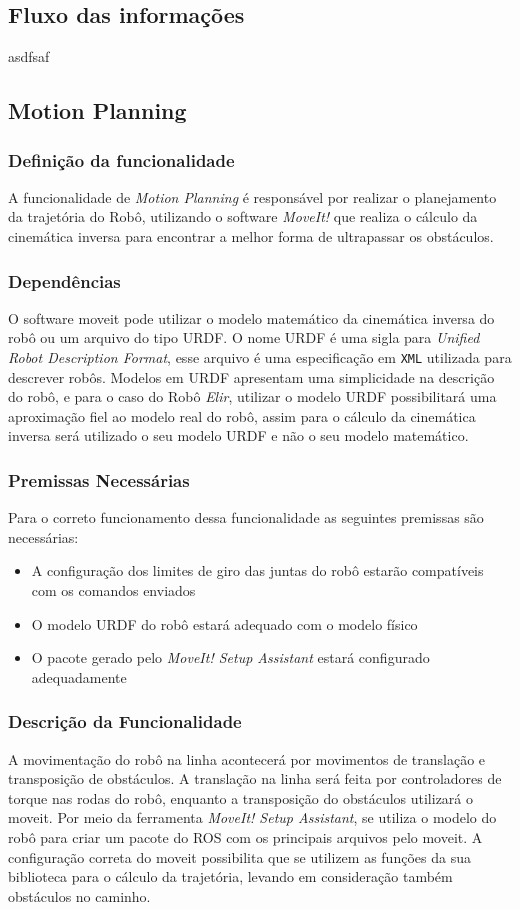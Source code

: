 \subsection{Fluxo das informações}
\label{ssec:fluxo}
asdfsaf

\subsection{Motion Planning}
\label{ssec:func1}
\subsubsection{Definição da funcionalidade}
A funcionalidade de \textit{Motion Planning} é responsável por realizar o planejamento da trajetória do Robô, utilizando o software \textit{MoveIt!} que realiza o cálculo da cinemática inversa para encontrar a melhor forma de ultrapassar os obstáculos.
\subsubsection{Dependências}
O software moveit pode utilizar o modelo matemático da cinemática inversa do robô ou um arquivo do tipo URDF.
O nome URDF é uma sigla para \textit{Unified Robot Description Format}, esse arquivo é uma especificação em \verb|XML| utilizada para descrever robôs. Modelos em URDF apresentam uma simplicidade na descrição do robô, e para o caso do Robô \textit{Elir}, utilizar o modelo URDF possibilitará uma aproximação fiel ao modelo real do robô, assim para o cálculo da cinemática inversa será utilizado o seu modelo URDF e não o seu modelo matemático.

\subsubsection{Premissas Necessárias}
Para o correto funcionamento dessa funcionalidade as seguintes premissas são necessárias:
\begin{itemize}
	\item A configuração dos limites de giro das juntas do robô estarão compatíveis com os comandos enviados
	\item O modelo URDF do robô estará adequado com o modelo físico
	\item O pacote gerado pelo \textit{MoveIt! Setup Assistant} estará configurado adequadamente
\end{itemize}
\subsubsection{Descrição da Funcionalidade}
A movimentação do robô na linha acontecerá por movimentos de translação e transposição de obstáculos. A translação na linha será feita por controladores de torque nas rodas do robô, enquanto a transposição do obstáculos utilizará o moveit.
Por meio da ferramenta \textit{MoveIt! Setup Assistant}, se utiliza o modelo do robô para criar um pacote do ROS com os principais arquivos pelo moveit. 
A configuração correta do moveit possibilita que se utilizem as funções da sua biblioteca para o cálculo da trajetória, levando em consideração também obstáculos no caminho.

